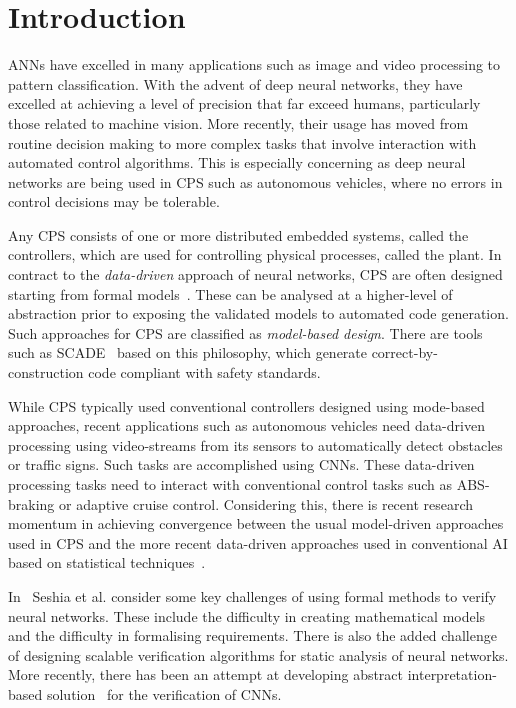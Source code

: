 \section{Introduction}
\acfp{ANN} have excelled in many applications such as
image and video processing to pattern classification. With the advent
of deep neural networks, they have excelled at achieving a level of
precision that far exceed humans, particularly those related to machine
vision.  More recently, their usage has moved from routine decision
making to more complex tasks that involve interaction with
automated control algorithms. This is especially concerning as deep neural networks are
being used in \acf{CPS} such as autonomous vehicles,
where no errors in control decisions may be tolerable. 

Any \ac{CPS}
consists of one or more distributed embedded systems, called the controllers, which are used
for controlling physical processes, called the plant.
In contract to the
\emph{data-driven} approach of neural networks, \ac{CPS} are often designed starting
from formal models~\cite{formal-methods}. These can be analysed at a
higher-level of abstraction prior to exposing the validated models to
automated code generation. Such approaches for
\ac{CPS} are classified as \emph{model-based design}. There are tools
such as SCADE~\cite{SCADE} based on this philosophy, which generate
correct-by-construction code compliant with safety standards.

While \ac{CPS} typically used conventional controllers designed using
mode-based approaches, recent applications such as
autonomous vehicles need data-driven processing using video-streams
from its sensors to automatically detect obstacles or traffic
signs. Such tasks are accomplished using \acfp{CNN}. These data-driven processing tasks need to interact with
conventional control tasks such as ABS-braking or adaptive cruise control.
Considering this, there is recent
research momentum in achieving convergence between the usual
model-driven approaches used in CPS and the more recent data-driven
approaches used in conventional AI based on statistical techniques~\cite{tripakis2018data}.

In~\cite{seshia2016towards} Seshia et al. consider some key challenges of 
using formal methods to verify neural networks. These include the
difficulty in creating mathematical models and the difficulty in
formalising requirements. There is also the
added challenge of designing scalable verification algorithms for
static analysis of neural networks. More recently, there has been
an attempt at developing abstract interpretation-based
solution~\cite{Gehr2018AI2SA} for the verification of CNNs. 


